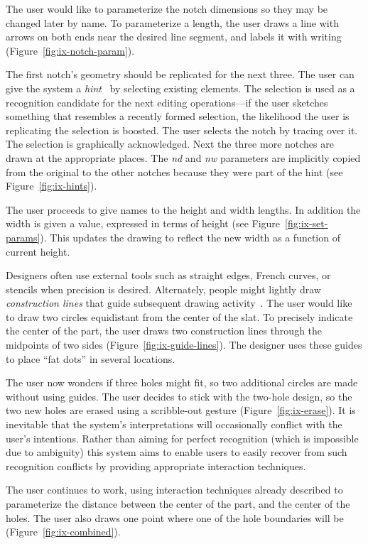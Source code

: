 \documentclass[11pt]{article}
\begin{document}
The user would like to parameterize the notch dimensions so they may be
changed later by name. To parameterize a length, the user draws a line
with arrows on both ends near the desired line segment, and labels it
with writing (Figure~\ref{fig:ix-notch-param}).

The first notch's geometry should be replicated for the next
three. The user can give the system a
\textit{hint}~\cite{mcdaniel-gamut} by selecting existing
elements. The selection is used as a recognition candidate for the
next editing operations---if the user sketches something that
resembles a recently formed selection, the likelihood the user is
replicating the selection is boosted. The user selects the notch by
tracing over it. The selection is graphically acknowledged. Next the
three more notches are drawn at the appropriate places. The
\textit{nd} and \textit{nw} parameters are implicitly copied from the
original to the other notches because they were part of the hint (see
Figure~\ref{fig:ix-hints}).

The user proceeds to give names to the height and width lengths. In
addition the width is given a value, expressed in terms of height (see
Figure~\ref{fig:ix-set-params}). This updates the drawing to reflect
the new width as a function of current height.

Designers often use external tools such as straight edges, French
curves, or stencils when precision is desired. Alternately, people
might lightly draw \textit{construction lines} that guide subsequent
drawing activity~\cite{company-sketching-in-engineering}. The user
would like to draw two circles equidistant from the center of the
slat. To precisely indicate the center of the part, the user draws two
construction lines through the midpoints of two sides
(Figure~\ref{fig:ix-guide-lines}). The designer uses these guides
to place ``fat dots'' in several locations.

The user now wonders if three holes might fit, so two additional
circles are made without using guides. The user decides to stick with
the two-hole design, so the two new holes are erased using a
scribble-out gesture (Figure~\ref{fig:ix-erase}). It is inevitable
that the system's interpretations will occasionally conflict with the
user's intentions. Rather than aiming for perfect recognition (which
is impossible due to ambiguity) this system aims to enable users to
easily recover from such recognition conflicts by providing
appropriate interaction techniques.

The user continues to work, using interaction techniques already
described to parameterize the distance between the center of the part,
and the center of the holes. The user also draws one point where one
of the hole boundaries will be (Figure~\ref{fig:ix-combined}).
\end{document}

